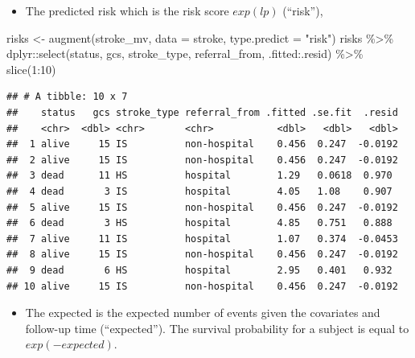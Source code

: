 \documentclass[
  10pt,
]{krantz}
\newenvironment{Shaded}{\begin{snugshade}}{\end{snugshade}}
\newcommand{\AttributeTok}[1]{\textcolor[rgb]{0.77,0.63,0.00}{#1}}
\newcommand{\DecValTok}[1]{\textcolor[rgb]{0.00,0.00,0.81}{#1}}
\newcommand{\FunctionTok}[1]{\textcolor[rgb]{0.00,0.00,0.00}{#1}}
\newcommand{\NormalTok}[1]{#1}
\newcommand{\OtherTok}[1]{\textcolor[rgb]{0.56,0.35,0.01}{#1}}
\newcommand{\SpecialCharTok}[1]{\textcolor[rgb]{0.00,0.00,0.00}{#1}}
\newcommand{\StringTok}[1]{\textcolor[rgb]{0.31,0.60,0.02}{#1}}
\providecommand{\tightlist}{%
  \setlength{\itemsep}{0pt}\setlength{\parskip}{0pt}}
\begin{document}
\begin{itemize}
\tightlist
\item
  The predicted risk which is the risk score \(exp(lp)\) (``risk''),
\end{itemize}

\begin{Shaded}
\begin{Highlighting}[]
\NormalTok{risks }\OtherTok{\textless{}{-}} 
  \FunctionTok{augment}\NormalTok{(stroke\_mv, }
                 \AttributeTok{data =}\NormalTok{ stroke, }
                 \AttributeTok{type.predict =} \StringTok{"risk"}\NormalTok{)}
\NormalTok{risks }\SpecialCharTok{\%\textgreater{}\%}
\NormalTok{  dplyr}\SpecialCharTok{::}\FunctionTok{select}\NormalTok{(status, gcs, stroke\_type, referral\_from, .fitted}\SpecialCharTok{:}\NormalTok{.resid) }\SpecialCharTok{\%\textgreater{}\%}
  \FunctionTok{slice}\NormalTok{(}\DecValTok{1}\SpecialCharTok{:}\DecValTok{10}\NormalTok{)}
\end{Highlighting}
\end{Shaded}

\begin{verbatim}
## # A tibble: 10 x 7
##    status   gcs stroke_type referral_from .fitted .se.fit  .resid
##    <chr>  <dbl> <chr>       <chr>           <dbl>   <dbl>   <dbl>
##  1 alive     15 IS          non-hospital    0.456  0.247  -0.0192
##  2 alive     15 IS          non-hospital    0.456  0.247  -0.0192
##  3 dead      11 HS          hospital        1.29   0.0618  0.970 
##  4 dead       3 IS          hospital        4.05   1.08    0.907 
##  5 alive     15 IS          non-hospital    0.456  0.247  -0.0192
##  6 dead       3 HS          hospital        4.85   0.751   0.888 
##  7 alive     11 IS          hospital        1.07   0.374  -0.0453
##  8 alive     15 IS          non-hospital    0.456  0.247  -0.0192
##  9 dead       6 HS          hospital        2.95   0.401   0.932 
## 10 alive     15 IS          non-hospital    0.456  0.247  -0.0192
\end{verbatim}

\begin{itemize}
\tightlist
\item
  The expected is the expected number of events given the covariates and follow-up time (``expected''). The survival probability for a subject is equal to \(exp(-expected)\).
\end{itemize}
\end{document}
